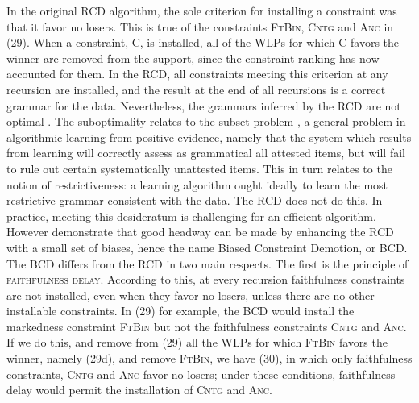 \documentclass[output=paper,
modfonts
]{LSP/langsci}
\begin{document}
In the original RCD algorithm, the sole criterion for installing a constraint was that it favor no losers. This is true of the constraints \textsc{FtBin, Cntg} and \textsc{Anc} in (29). When a constraint, C, is installed, all of the WLPs for which C favors the winner are removed from the support, since the constraint ranking has now accounted for them. In the RCD, all constraints meeting this criterion at any recursion are installed, and the result at the end of all recursions is a correct grammar for the data. Nevertheless, the grammars inferred by the RCD are not optimal \citep{princetesar2004}. The suboptimality relates to the subset problem \citep{baker1979r,angluin1980}, a general problem in algorithmic learning from positive evidence, namely that the system which results from learning will correctly assess as grammatical all attested items, but will fail to rule out certain systematically unattested items. This in turn relates to the notion of restrictiveness: a learning algorithm ought ideally to learn the most restrictive grammar consistent with the data. The RCD does not do this. In practice, meeting this desideratum is challenging for an efficient algorithm. However \citet{princetesar2004} demonstrate that good headway can be made by enhancing the RCD with a small set of biases, hence the name Biased Constraint Demotion, or BCD. The BCD differs from the RCD in two main respects. The first is the principle of \textsc{faithfulness delay}. According to this, at every recursion faithfulness constraints are not installed, even when they favor no losers, unless there are no other installable constraints. In (29) for example, the BCD would install the markedness constraint \textsc{FtBin} but not the faithfulness constraints \textsc{Cntg} and \textsc{Anc}. If we do this, and remove from (29) all the WLPs for which \textsc{FtBin} favors the winner, namely (29d), and remove \textsc{FtBin}, we have (30), in which only faithfulness constraints, \textsc{Cntg} and \textsc{Anc} favor no losers; under these conditions, faithfulness delay would permit the installation of \textsc{Cntg} and \textsc{Anc}. 
\end{document}
